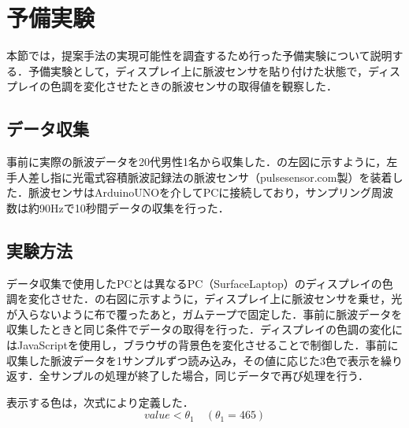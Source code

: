 \documentclass[submit,techrep]{ipsj}
\begin{document}






\section{予備実験}
\label{preliminary}
本節では，提案手法の実現可能性を調査するため行った予備実験について説明する．予備実験として，ディスプレイ上に脈波センサを貼り付けた状態で，ディスプレイの色調を変化させたときの脈波センサの取得値を観察した．


\subsection{データ収集}
事前に実際の脈波データを20代男性1名から収集した．の左図に示すように，左手人差し指に光電式容積脈波記録法の脈波センサ（pulsesensor.com製）を装着した．脈波センサはArduinoUNOを介してPCに接続しており，サンプリング周波数は約90Hzで10秒間データの収集を行った．

\subsection{実験方法}
データ収集で使用したPCとは異なるPC（SurfaceLaptop）のディスプレイの色調を変化させた．の右図に示すように，ディスプレイ上に脈波センサを乗せ，光が入らないように布で覆ったあと，ガムテープで固定した．事前に脈波データを収集したときと同じ条件でデータの取得を行った．ディスプレイの色調の変化にはJavaScriptを使用し，ブラウザの背景色を変化させることで制御した．事前に収集した脈波データを1サンプルずつ読み込み，その値に応じた3色で表示を繰り返す．全サンプルの処理が終了した場合，同じデータで再び処理を行う．
\par

表示する色は，次式により定義した．
\begin{equation}
	\label{eqn:low}
	value < \theta_{1} \quad (\theta_{1}=465)
\end{equation}
\end{document}
